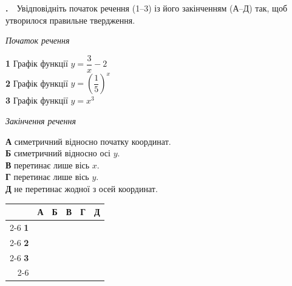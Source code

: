 \documentclass[12pt]{article}
\newcommand{\matchingGrid}{%
    \begingroup
    \renewcommand{\arraystretch}{1.15}
    \setlength{\tabcolsep}{4pt}
    \footnotesize
    \begin{tabular}{r|c|c|c|c|c|}
         \multicolumn{1}{c}{} & \multicolumn{1}{c}{\textbf{А}} & \multicolumn{1}{c}{\textbf{Б}} & \multicolumn{1}{c}{\textbf{В}} & \multicolumn{1}{c}{\textbf{Г}} & \multicolumn{1}{c}{\textbf{Д}} \\ \cline{2-6}
         \textbf{1} & \phantom{X} & \phantom{X} & \phantom{X} & \phantom{X} & \phantom{X} \\ \cline{2-6}
         \textbf{2} & & & & & \\ \cline{2-6}
         \textbf{3} & & & & & \\ \cline{2-6}
    \end{tabular}
    \endgroup
}
\newcounter{zad}
\newcommand{\zadtask}[1]{\stepcounter{zad}\noindent\textbf{\thezad.}\ \ #1\par\vspace{0.2cm}}
\begin{document}
\zadtask{Увідповідніть початок речення (1--3) із його закінченням (А--Д) так, щоб утворилося правильне твердження.

\vspace{0.2cm}
\noindent
\begin{minipage}[t]{0.42\textwidth}
\textit{Початок речення}\par\vspace{0.2cm}
\textbf{1} \quad Графік функції $y = \dfrac{3}{x} - 2$\\[0.4cm]
\textbf{2} \quad Графік функції $y = \left(\dfrac{1}{5}\right)^{x}$\\[0.3cm]
\textbf{3} \quad Графік функції $y = x^3$
\end{minipage}
\hfill
\begin{minipage}[t]{0.42\textwidth}
\textit{Закінчення речення}\par\vspace{0.2cm}
\textbf{А} \quad симетричний відносно початку координат.\\[0.15cm]
\textbf{Б} \quad симетричний відносно осі $y$.\\[0.15cm]
\textbf{В} \quad перетинає лише вісь $x$.\\[0.15cm]
\textbf{Г} \quad перетинає лише вісь $y$.\\[0.15cm]
\textbf{Д} \quad не перетинає жодної з осей координат.
\end{minipage}
\hfill
\begin{minipage}[t]{0.14\textwidth}
\vspace{0.4cm}
\begin{flushright}\matchingGrid\end{flushright}
\end{minipage}
}
\end{document}
